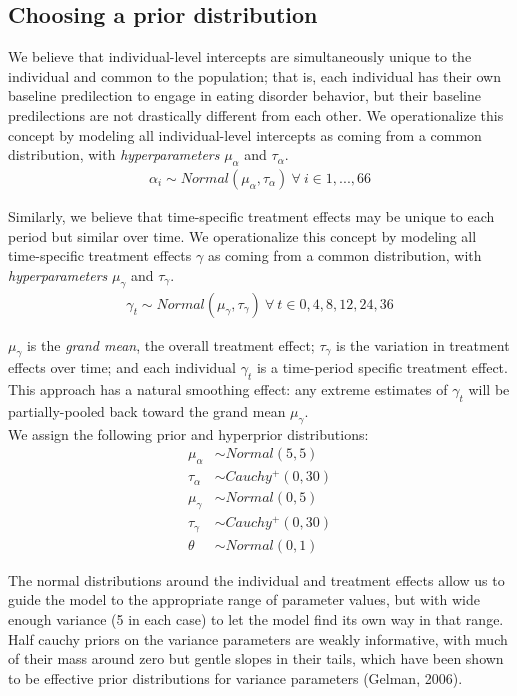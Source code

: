 \documentclass[12pt, oneside]{article}
\begin{document}
\subsection*{Choosing a prior distribution}
We believe that individual-level intercepts are simultaneously unique to the individual and common to the population; that is, each individual has their own baseline predilection to engage in eating disorder behavior, but their baseline predilections are not drastically different from each other.  We operationalize this concept by modeling all individual-level intercepts as coming from a common distribution, with \emph{hyperparameters} $\mu_{\alpha}$ and $\tau_{\alpha}$.
\begin{align}
\alpha_i \sim Normal(\mu_{\alpha}, \tau_{\alpha}) \ \forall \ i \in 1,...,66
\end{align} 

Similarly, we believe that time-specific treatment effects may be unique to each period but similar over time. We operationalize this concept by modeling all time-specific treatment effects $\gamma$ as coming from a common distribution, with \emph{hyperparameters} $\mu_{\gamma}$ and $\tau_{\gamma}$.
\begin{align}
\gamma_t \sim Normal(\mu_{\gamma}, \tau_{\gamma}) \ \forall \ t \in 0, 4, 8, 12, 24, 36
\end{align} 

$\mu_{\gamma}$ is the \emph{grand mean}, the overall treatment effect; $\tau_{\gamma}$ is the variation in treatment effects over time; and each individual $\gamma_t$ is a time-period specific treatment effect.  This approach has a natural smoothing effect: any extreme estimates of $\gamma_t$ will be partially-pooled back toward the grand mean $\mu_{\gamma}$.
\\

We assign the following prior and hyperprior distributions:
\begin{align}
\mu_{\alpha} &\sim Normal(5, 5) \\
\tau_{\alpha} &\sim Cauchy^+(0, 30) \\
\mu_{\gamma} &\sim Normal(0, 5) \\
\tau_{\gamma} &\sim Cauchy^+(0, 30) \\
\theta &\sim Normal(0, 1)
\end{align}

The normal distributions around the individual and treatment effects allow us to guide the model to the appropriate range of parameter values, but with wide enough variance (5 in each case) to let the model find its own way in that range.  Half cauchy priors on the variance parameters are weakly informative, with much of their mass around zero but gentle slopes in their tails, which have been shown to be effective prior distributions for variance parameters (Gelman, 2006).
\end{document}
